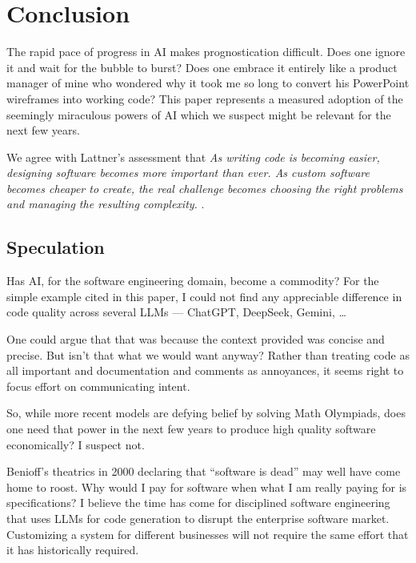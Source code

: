 \documentclass[letterpaper,12pt]{article}
\begin{document}
\section{Conclusion}

The rapid pace of progress in AI makes prognostication difficult. 
Does one ignore it and wait for the bubble to burst? 
Does one embrace it entirely like a product manager of mine who wondered why it
took me so long to convert his PowerPoint wireframes into working code?
This paper represents a measured adoption of the seemingly miraculous powers of
AI which we suspect might be relevant for the next few years.

We agree with Lattner's assessment that
{\em As writing code is becoming easier, designing software becomes more
important than ever. As custom software becomes cheaper to create, the real
challenge becomes choosing the right problems and managing the resulting
complexity.  } \cite{CCC_Lattner_2026}.

\subsection{Speculation}

\be
\item Has AI, for the software engineering domain, become a commodity? 
  For the simple example cited in this paper, I could not find any
  appreciable difference in code quality across several LLMs --- ChatGPT,
  DeepSeek, Gemini, \ldots

One could argue that that was because the context provided was concise and
precise. But isn't that what we would want anyway? 
Rather than treating code as all important and 
documentation and comments as annoyances, it seems right to focus effort on
communicating intent. 

So, while more recent models are defying belief by solving Math Olympiads, 
does one need that power in the next few years to produce high 
quality software economically? I suspect not. 

\item Benioff's theatrics in 2000 declaring that ``software is dead'' 
  may well have come home to roost. Why would I pay for software when what I am
  really paying for is specifications? I believe the time has
  come for disciplined software engineering that uses LLMs for code 
  generation to disrupt the enterprise software market. Customizing a system
  for different businesses will not require the same effort that it has historically required. 
  
\end{document}
